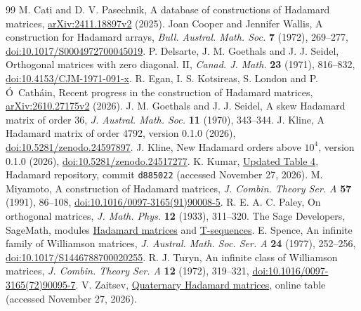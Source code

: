 \documentclass[10pt]{article}
\begin{document}
\begin{thebibliography}{99}\small
{} M. Cati and D. V. Pasechnik, A database of constructions of Hadamard matrices, \href{https://arxiv.org/abs/2411.18897v2}{arXiv:2411.18897v2} (2025).
 Joan Cooper and Jennifer Wallis, A construction for Hadamard arrays, \emph{Bull. Austral. Math. Soc.} \textbf{7} (1972), 269--277, \href{https://doi.org/10.1017/S0004972700045019}{doi:10.1017/S0004972700045019}.
 P. Delsarte, J. M. Goethals and J. J. Seidel, Orthogonal matrices with zero diagonal. II, \emph{Canad. J. Math.} \textbf{23} (1971), 816--832, \href{https://doi.org/10.4153/CJM-1971-091-x}{doi:10.4153/CJM-1971-091-x}.
 R. Egan, I. S. Kotsireas, S. London and P. \'O~Cath\'ain, Recent progress in the construction of Hadamard matrices, \href{https://arxiv.org/abs/2610.27175v2}{arXiv:2610.27175v2} (2026).
 J. M. Goethals and J. J. Seidel, A skew Hadamard matrix of order 36, \emph{J. Austral. Math. Soc.} \textbf{11} (1970), 343--344.
 J. Kline, A Hadamard matrix of order 4792, version 0.1.0 (2026), \href{https://doi.org/10.5281/zenodo.24597897}{doi:10.5281/zenodo.24597897}.
 J. Kline, New Hadamard orders above $10^4$, version 0.1.0 (2026), \href{https://doi.org/10.5281/zenodo.24517277}{doi:10.5281/zenodo.24517277}.
 K. Kumar, \href{https://github.com/vatskishan03/Hadamard/blob/d885022144ba6bf4efa8315e14871a3736947527/FRONTIER.md\#L58-L62}{Updated Table 4}, Hadamard repository, commit \texttt{d885022} (accessed November 27, 2026).
 M. Miyamoto, A construction of Hadamard matrices, \emph{J. Combin. Theory Ser. A} \textbf{57} (1991), 86--108, \href{https://doi.org/10.1016/0097-3165(91)90008-5}{doi:10.1016/0097-3165(91)90008-5}.
 R. E. A. C. Paley, On orthogonal matrices, \emph{J. Math. Phys.} \textbf{12} (1933), 311--320.
 The Sage Developers, SageMath, modules \href{https://doc.sagemath.org/html/en/reference/combinat/sage/combinat/matrices/hadamard_matrix.html}{Hadamard matrices} and \href{https://doc.sagemath.org/html/en/reference/combinat/sage/combinat/t_sequences.html}{T-sequences}.
 E. Spence, An infinite family of Williamson matrices, \emph{J. Austral. Math. Soc. Ser. A} \textbf{24} (1977), 252--256, \href{https://doi.org/10.1017/S1446788700020255}{doi:10.1017/S1446788700020255}.
 R. J. Turyn, An infinite class of Williamson matrices, \emph{J. Combin. Theory Ser. A} \textbf{12} (1972), 319--321, \href{https://doi.org/10.1016/0097-3165(72)90095-7}{doi:10.1016/0097-3165(72)90095-7}.
 V. Zaitsev, \href{https://www.cs.uleth.ca/~zaitsevv/quaternary.html}{Quaternary Hadamard matrices}, online table (accessed November 27, 2026).
\end{thebibliography}
\end{document}
